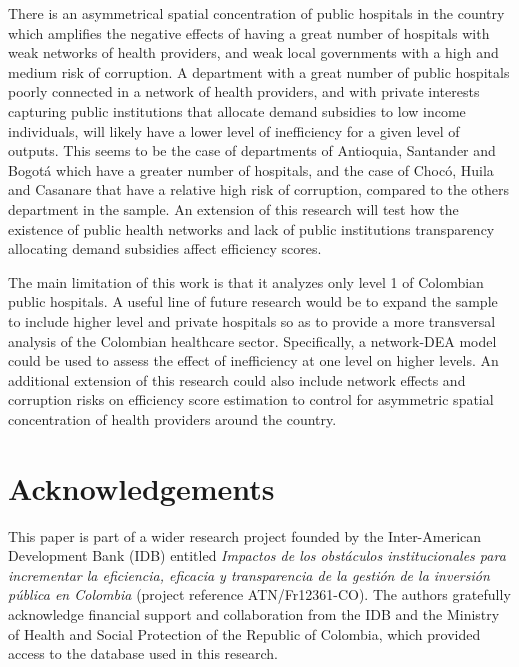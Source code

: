 \documentclass[11pt,a4paper,oneside]{article}
\begin{document}
There is an asymmetrical spatial concentration of public hospitals in the country which amplifies the negative effects of having a great number of hospitals with weak networks of health providers, and weak local governments with a high and medium risk of corruption. A department with a great number of public hospitals poorly connected in a network of health providers, and with private interests capturing public institutions that allocate demand subsidies to low income individuals, will likely have a lower level of inefficiency for a given level of outputs. This seems to be the case of departments of Antioquia, Santander and Bogot\'a which have a greater number of hospitals, and the case of Choc\'o, Huila and Casanare that have a relative high risk of corruption, compared to the others department in the sample. An extension of this research will test how the existence of public health networks and lack of public institutions transparency allocating demand subsidies affect efficiency scores.    
  

\color{black}


The main limitation of this work is that it analyzes only level 1 of Colombian public hospitals. A useful line of future research would be to expand the sample to include higher level and private hospitals so as to provide a more transversal analysis of the Colombian healthcare sector. Specifically, a network-DEA model could be used to assess the effect of inefficiency at one level on higher levels. An additional extension of this research could also include network effects and corruption risks on efficiency score estimation to control for asymmetric spatial concentration of health providers around the country.  





% 






\section*{Acknowledgements}

This paper is part of a wider research project founded by the Inter-American Development Bank (IDB) entitled \textit{Impactos de los obst\'aculos institucionales para incrementar la eficiencia, eficacia y transparencia de la gesti\'on de la inversi\'on p\'ublica en Colombia} (project reference ATN/Fr12361-CO). The authors gratefully acknowledge financial support and collaboration from the IDB and the Ministry of Health and Social Protection of the Republic of Colombia, which provided access to the database used in this research.
\end{document}

